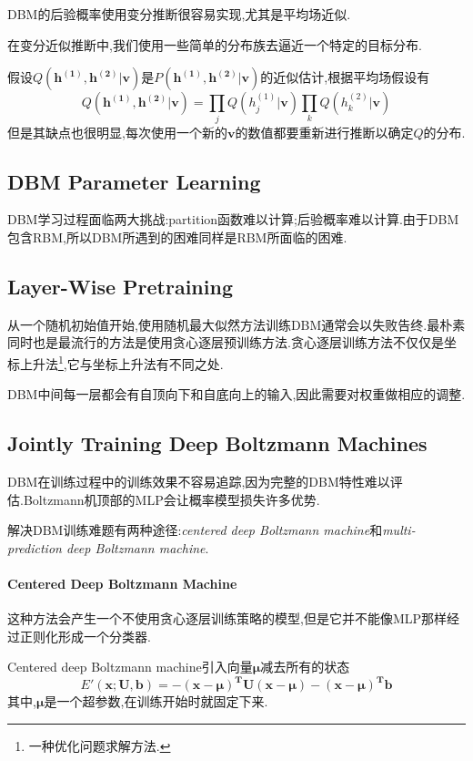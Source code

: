 DBM的后验概率使用变分推断很容易实现,尤其是平均场近似.

在变分近似推断中,我们使用一些简单的分布族去逼近一个特定的目标分布.

假设$Q(\bm{h^{(1)},h^{(2)}|v})$是$P(\bm{h^{(1)},h^{(2)}|v})$的近似估计,根据平均场假设有
\begin{equation}
Q(\bm{h^{(1)},h^{(2)}|v})=\prod_jQ(h_j^{(1)}|\bm v)\prod_kQ(h_k^{(2)}|\bm v)
\end{equation}
但是其缺点也很明显,每次使用一个新的$\bm v$的数值都要重新进行推断以确定$Q$的分布.

\subsection{DBM Parameter Learning}

DBM学习过程面临两大挑战:partition函数难以计算;后验概率难以计算.由于DBM包含RBM,所以DBM所遇到的困难同样是RBM所面临的困难.

\subsection{Layer-Wise Pretraining}

从一个随机初始值开始,使用随机最大似然方法训练DBM通常会以失败告终.最朴素同时也是最流行的方法是使用贪心逐层预训练方法.贪心逐层训练方法不仅仅是坐标上升法\footnote{一种优化问题求解方法.},它与坐标上升法有不同之处.

DBM中间每一层都会有自顶向下和自底向上的输入,因此需要对权重做相应的调整.

\subsection{Jointly Training Deep Boltzmann Machines}

DBM在训练过程中的训练效果不容易追踪,因为完整的DBM特性难以评估.Boltzmann机顶部的MLP会让概率模型损失许多优势.

解决DBM训练难题有两种途径:\textit{centered deep Boltzmann machine}和\textit{multi-prediction deep Boltzmann machine}.

\paragraph{Centered Deep Boltzmann Machine}这种方法会产生一个不使用贪心逐层训练策略的模型,但是它并不能像MLP那样经过正则化形成一个分类器.

Centered deep Boltzmann machine引入向量$\bm\mu$减去所有的状态
\begin{equation}
E'(\bm{x;U,b})=\bm{-(x-\mu)^TU(x-\mu)-(x-\mu)^Tb}
\end{equation}
其中,$\bm\mu$是一个超参数,在训练开始时就固定下来.

